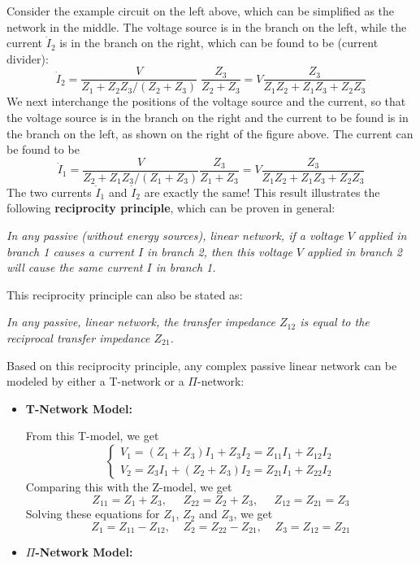 \begin{itemize}
Consider the example circuit on the left above, which can be simplified 
as the network in the middle. The voltage source is in the branch on the
left, while the current $\dot{I}_2$ is in the branch on the right, which
can be found to be (current divider):
\[ \dot{I}_2=\frac{V}{Z_1+Z_2 Z_3/(Z_2+Z_3)}\;\frac{Z_3}{Z_2+Z_3}
=V \frac{Z_3}{Z_1Z_2+Z_1Z_3+Z_2Z_3} \]
We next interchange the positions of the voltage source and the current, 
so that the voltage source is in the branch on the right and the current 
to be found is in the branch on the left, as shown on the right of the 
figure above. The current can be found to be
\[ \dot{I}_1=\frac{V}{Z_2+Z_1 Z_3/(Z_1+Z_3)}\frac{Z_3}{Z_1+Z_3}
=V \frac{Z_3}{Z_1Z_2+Z_1Z_3+Z_2Z_3} \]
The two currents $\dot{I}_1$ and $\dot{I}_2$ are exactly the same! This
result illustrates the following {\bf reciprocity principle}, which can 
be proven in general:

{\em 
In any passive (without energy sources), 
linear network, if a voltage $V$ applied in branch 1 causes a current $I$ in 
branch 2, then this voltage $V$ applied in branch 2 will cause the same current
$I$ in branch 1.}

This reciprocity principle can also be stated as:

{\em In any passive, linear network, the transfer impedance $Z_{12}$ is equal 
to the reciprocal transfer impedance $Z_{21}$.}

Based on this reciprocity principle, any complex passive linear network can
be modeled by either a T-network or a $\Pi$-network:

\begin{itemize}
  \item {\bf T-Network Model:}

    From this T-model, we get
    \[	\left\{ \begin{array}{l} V_1=(Z_1+Z_3)I_1+Z_3I_2=Z_{11}I_1+Z_{12}I_2 \\
      V_2=Z_3I_1+(Z_2+Z_3)I_2=Z_{21}I_1+Z_{22}I_2  \end{array} \right. \]
    Comparing this with the Z-model, we get
    \[ Z_{11}=Z_1+Z_3,\;\;\;\;\;Z_{22}=Z_2+Z_3,\;\;\;\;\;Z_{12}=Z_{21}=Z_3	\]
    Solving these equations for $Z_1$, $Z_2$ and $Z_3$, we get
    \[ Z_1=Z_{11}-Z_{12},\;\;\;\;Z_2=Z_{22}-Z_{21},\;\;\;\;Z_3=Z_{12}=Z_{21} \]

  \item {\bf $\Pi$-Network Model:}


\end{itemize}
\end{itemize}
